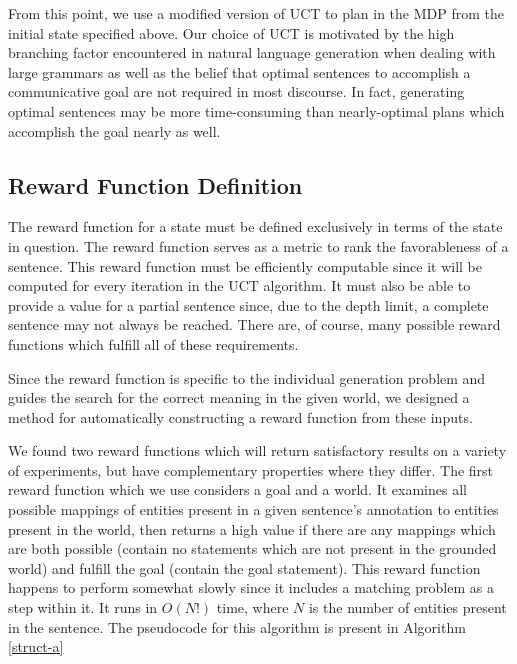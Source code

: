 From this point, we use a modified version of UCT
to plan in the MDP from the initial state specified above. 
Our choice of UCT is motivated by the high branching factor encountered in natural language generation when dealing with
large grammars as well as the belief that optimal sentences to accomplish a communicative goal are not required in most
discourse. In fact, generating optimal sentences may be more time-consuming than nearly-optimal plans which accomplish
the goal nearly as well.

\subsection{Reward Function Definition}

 The reward function for a state must be defined exclusively in terms
 of the state in question.  The reward function serves as a metric to
 rank the favorableness of a sentence.  This reward function must be
 efficiently computable since it will be computed for every iteration
 in the UCT algorithm.  It must also be able to provide a value for a
 partial sentence since, due to the depth limit, a complete sentence
 may not always be reached.  There are, of course, many
possible reward functions which fulfill all of these requirements.

Since the reward function is specific to the individual generation
problem and guides the search for the correct meaning in the
given world, we designed a method for automatically constructing
a reward function from these inputs.
 
We found two reward functions which will
 return satisfactory results on a variety of experiments, but have complementary
properties where they differ.  The first reward function
 which we use considers a goal and a
 world.  It examines all possible mappings of entities present in
 a given sentence's annotation to entities present in the world, then returns
 a high value if there are any mappings which are both possible (contain no statements
 which are not present in the grounded world) and fulfill the goal (contain the
 goal statement).  This reward function happens to perform somewhat slowly since it includes
a matching problem as a step within it.  It runs in $O(N!)$ time, where
$N$ is the number of entities present in the sentence.  The pseudocode for this algorithm
is present in Algorithm \ref{struct-a}

